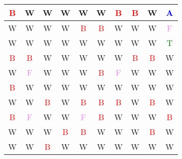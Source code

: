 \documentclass{article}
\begin{document}
	    \begin{latin}
	    \begin{center}
	    	\begin{tabular}{|c|c|c|c|c|c|c|c|c|c|}
	    		\hline
	    		\textcolor{red}{B}&W&W&W&W&W&\textcolor{red}{B}&\textcolor{red}{B}&W&\textcolor{blue}{A}\\
	    		\hline
	    		W&W&W&W&\textcolor{red}{B}&\textcolor{red}{B}&W&W&W&\textcolor{violet}{F}\\
	    		\hline
	    		W&W&W&W&W&W&W&W&W&\textcolor{green}{T}\\
	    		\hline
	    		\textcolor{red}{B}&\textcolor{red}{B}&W&W&W&W&W&\textcolor{red}{B}&\textcolor{red}{B}&W\\
	    		\hline
	    		W&\textcolor{violet}{F}&W&W&W&\textcolor{red}{B}&\textcolor{violet}{F}&W&W&W\\
	    		\hline
	    		\textcolor{red}{B}&W&W&W&W&W&W&W&W&W\\
	    		\hline
	    		W&W&\textcolor{red}{B}&W&\textcolor{red}{B}&\textcolor{red}{B}&\textcolor{red}{B}&W&\textcolor{red}{B}&W\\
	    		\hline
	    		\textcolor{red}{B}&\textcolor{violet}{F}&W&W&\textcolor{violet}{F}&\textcolor{red}{B}&W&W&W&\textcolor{red}{B}\\
	    		\hline
	    		W&W&W&\textcolor{red}{B}&\textcolor{red}{B}&W&W&W&\textcolor{red}{B}&W\\
	    		\hline
	    		W&W&\textcolor{red}{B}&W&W&W&W&W&W&W\\
	    		\hline
	    	\end{tabular}
	    \end{center}
    \end{latin}
\end{document}

